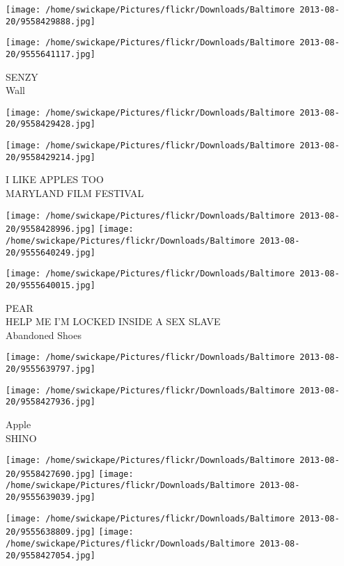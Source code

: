 \documentclass[10pt,letterpaper]{article}
\begin{document}
\texttt{[image: /home/swickape/Pictures/flickr/Downloads/Baltimore 2013-08-20/9558429888.jpg]}

\vspace{0.25in}
\texttt{[image: /home/swickape/Pictures/flickr/Downloads/Baltimore 2013-08-20/9555641117.jpg]}

SENZY\\
Wall\\
\pagebreak

\texttt{[image: /home/swickape/Pictures/flickr/Downloads/Baltimore 2013-08-20/9558429428.jpg]}

\vspace{0.25in}
\texttt{[image: /home/swickape/Pictures/flickr/Downloads/Baltimore 2013-08-20/9558429214.jpg]}

I LIKE APPLES TOO\\
MARYLAND FILM FESTIVAL\\
\pagebreak

\texttt{[image: /home/swickape/Pictures/flickr/Downloads/Baltimore 2013-08-20/9558428996.jpg]}
\texttt{[image: /home/swickape/Pictures/flickr/Downloads/Baltimore 2013-08-20/9555640249.jpg]}

\vspace{0.25in}
\texttt{[image: /home/swickape/Pictures/flickr/Downloads/Baltimore 2013-08-20/9555640015.jpg]}

PEAR\\
HELP ME I'M LOCKED INSIDE A SEX SLAVE\\
Abandoned Shoes\\
\pagebreak

\texttt{[image: /home/swickape/Pictures/flickr/Downloads/Baltimore 2013-08-20/9555639797.jpg]}

\vspace{0.25in}
\texttt{[image: /home/swickape/Pictures/flickr/Downloads/Baltimore 2013-08-20/9558427936.jpg]}

Apple\\
SHINO\\
\pagebreak

\texttt{[image: /home/swickape/Pictures/flickr/Downloads/Baltimore 2013-08-20/9558427690.jpg]}
\texttt{[image: /home/swickape/Pictures/flickr/Downloads/Baltimore 2013-08-20/9555639039.jpg]}

\texttt{[image: /home/swickape/Pictures/flickr/Downloads/Baltimore 2013-08-20/9555638809.jpg]}
\texttt{[image: /home/swickape/Pictures/flickr/Downloads/Baltimore 2013-08-20/9558427054.jpg]}
\end{document}
